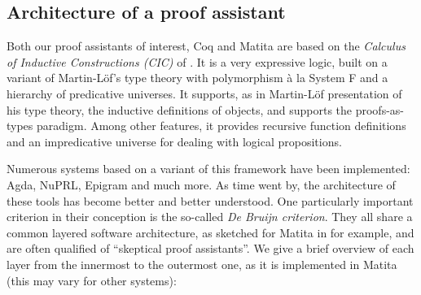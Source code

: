 \documentclass[twoside,a4paper,12pt]{article}
\begin{document}
\subsection*{Architecture of a proof assistant}

Both our proof assistants of interest, \textsf{Coq} and
\textsf{Matita} are based on the \emph{Calculus of Inductive
  Constructions (CIC)} of \cite{paulin1996definitions}. It is a very
expressive logic, built on a variant of Martin-L\"of's type theory
with polymorphism \`a la System F and a hierarchy of predicative
universes. It supports, as in Martin-L\"of presentation of his type
theory, the inductive definitions of objects, and supports the
proofs-as-types paradigm. Among other features, it provides recursive
function definitions and an impredicative universe for dealing with
logical propositions.

Numerous systems based on a variant of this framework have been
implemented: \textsf{Agda}, \textsf{NuPRL}, \textsf{Epigram} and much
more. As time went by, the architecture of these tools has become
better and better understood. One particularly important criterion in
their conception is the so-called \emph{De Bruijn criterion}. They all
share a common layered software architecture, as sketched for
\textsf{Matita} in \cite{asperti2007crafting} for example, and are
often qualified of ``skeptical proof assistants''. We give a brief
overview of each layer from the innermost to the outermost one, as it
is implemented in \textsf{Matita} (this may vary for other systems):
\end{document}
